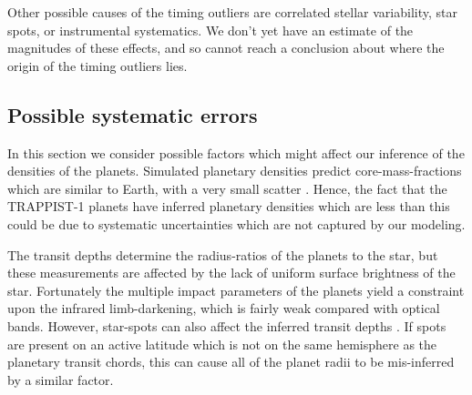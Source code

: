 \documentclass[twocolumn]{aastex63}
\begin{document}
Other possible causes of the timing outliers are correlated stellar variability, star spots, or instrumental systematics.  We don't yet have an estimate of the magnitudes of these effects, and so cannot reach a conclusion about where the origin of the timing outliers lies.





\subsection{Possible systematic errors}

In this section we consider possible factors which might affect our
inference of the densities of the planets.  Simulated planetary
densities predict core-mass-fractions which are similar to 
Earth, with a very small scatter \citep{Scora2020}.  Hence, the
fact that the TRAPPIST-1 planets have inferred planetary densities
which are less than this could be due to systematic uncertainties
which are not captured by our modeling.

The transit depths
determine the radius-ratios of the planets to the star, but these
measurements are affected by the lack of uniform surface brightness
of the star.  Fortunately the multiple impact parameters of the
planets yield a constraint upon the infrared limb-darkening, which
is fairly weak compared with optical bands.  However, star-spots
can also affect the inferred transit depths \citep{Rackham2018,
Kipping2012b}.  If spots are present on an active latitude
which is not on the same hemisphere as the planetary transit chords,
this can cause all of the planet radii to be mis-inferred by a similar
factor.
\end{document}
